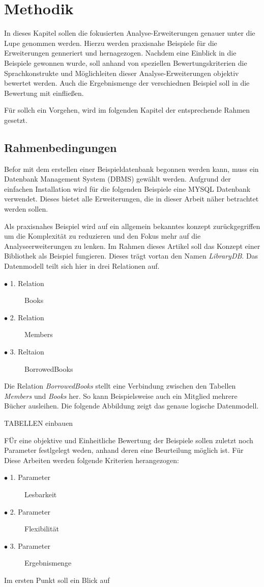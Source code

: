 \chapter{Methodik}
In dieses Kapitel sollen die fokusierten Analyse-Erweiterungen genauer unter die
Lupe genommen werden. Hierzu werden praxisnahe Beispiele für die Erweiterungen
genneriert und hernagezogen. Nachdem eine Einblick in die Beispiele gewonnen wurde,
soll anhand von speziellen Bewertungskriterien die Sprachkonstrukte und
Möglichleiten dieser Analyse-Erweiterungen objektiv bewertet werden. Auch die Ergebnismenge
der verschiednen Beispiel soll in die Bewertung mit einfließen.

Für sollch ein Vorgehen, wird im folgenden Kapitel der entsprechende Rahmen
gesetzt.

\section{Rahmenbedingungen}
Befor mit dem erstellen einer Beispieldatenbank begonnen werden kann, muss ein Datenbank
Management System (DBMS) gewählt werden. Aufgrund der einfachen Installation
wird für die folgenden Beispiele eine MYSQL Datenbank verwendet. Dieses bietet alle
Erweiterungen, die in dieser Arbeit näher betrachtet werden sollen.

Als praxisnahes Beispiel wird auf ein allgemein bekanntes konzept
zurückgegriffen um die Komplexität zu reduzieren und den Fokus mehr auf die
Analyseerweiterungen zu lenken. Im Rahmen dieses Artikel soll das Konzept einer Bibliothek
als Beispiel fungieren. Dieses trägt vortan den Namen \textit{LibraryDB}. Das
Datenmodell teilt sich hier in drei Relationen auf.
\begin{description}
	\item[$\bullet$ 1. Relation] Books
	\item[$\bullet$ 2. Relation] Members
	\item[$\bullet$ 3. Reltaion] BorrowedBooks
\end{description}
Die Relation \textit{BorrowedBooks} stellt eine Verbindung zwischen den Tabellen
\textit{Members} und \textit{Books} her. So kann Beispielsweise auch ein Mitglied
mehrere Bücher ausleihen. Die folgende Abbildung zeigt das genaue logische Datenmodell.

TABELLEN einbauen

FÜr eine objektive und Einheitliche Bewertung der Beispiele sollen zuletzt noch Parameter
festlgelegt weden, anhand deren eine Beurteilung möglich ist. Für Diese Arbeiten werden
folgende Kriterien herangezogen:
\begin{description}
	\item[$\bullet$ 1. Parameter] Lesbarkeit
	\item[$\bullet$ 2. Parameter] Flexibilität
	\item[$\bullet$ 3. Parameter] Ergebnismenge
\end{description}
Im ersten Punkt soll ein Blick auf 


